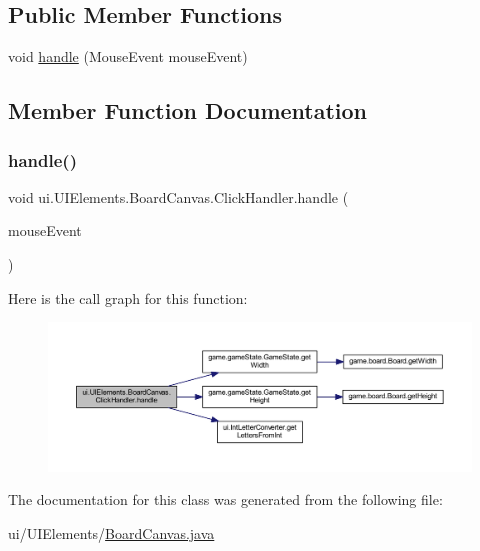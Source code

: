 \subsection*{Public Member Functions}
\begin{DoxyCompactItemize}
\item 
void \mbox{\hyperlink{classui_1_1_u_i_elements_1_1_board_canvas_1_1_click_handler_a84eaaabde709765305c31a38f59880e6}{handle}} (Mouse\+Event mouse\+Event)
\end{DoxyCompactItemize}


\subsection{Member Function Documentation}
\mbox{\label{classui_1_1_u_i_elements_1_1_board_canvas_1_1_click_handler_a84eaaabde709765305c31a38f59880e6}} 
\subsubsection{\texorpdfstring{handle()}{handle()}}
{\footnotesize\ttfamily void ui.\+U\+I\+Elements.\+Board\+Canvas.\+Click\+Handler.\+handle (\begin{DoxyParamCaption}\item[{Mouse\+Event}]{mouse\+Event }\end{DoxyParamCaption})\hspace{0.3cm}{\ttfamily [inline]}}

Here is the call graph for this function\+:
\nopagebreak
\begin{figure}[H]
\begin{center}
\leavevmode
\includegraphics[width=350pt]{classui_1_1_u_i_elements_1_1_board_canvas_1_1_click_handler_a84eaaabde709765305c31a38f59880e6_cgraph}
\end{center}
\end{figure}


The documentation for this class was generated from the following file\+:\begin{DoxyCompactItemize}
\item 
ui/\+U\+I\+Elements/\mbox{\hyperlink{_board_canvas_8java}{Board\+Canvas.\+java}}\end{DoxyCompactItemize}
